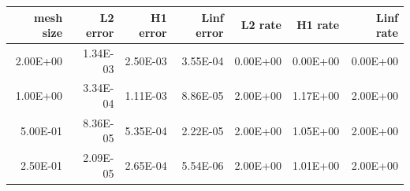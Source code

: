 \begin{tabular}{rrrrrrr}
\toprule
mesh size & L2 error & H1 error & Linf error & L2 rate & H1 rate & Linf rate \\
\midrule
2.00E+00 & 1.34E-03 & 2.50E-03 & 3.55E-04 & 0.00E+00 & 0.00E+00 & 0.00E+00 \\
1.00E+00 & 3.34E-04 & 1.11E-03 & 8.86E-05 & 2.00E+00 & 1.17E+00 & 2.00E+00 \\
5.00E-01 & 8.36E-05 & 5.35E-04 & 2.22E-05 & 2.00E+00 & 1.05E+00 & 2.00E+00 \\
2.50E-01 & 2.09E-05 & 2.65E-04 & 5.54E-06 & 2.00E+00 & 1.01E+00 & 2.00E+00 \\
\bottomrule
\end{tabular}
